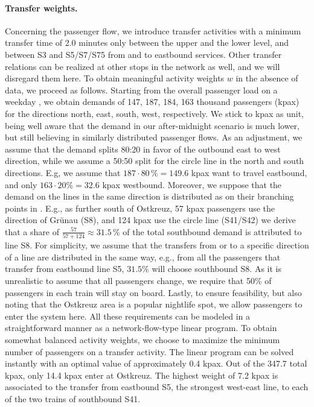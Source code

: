\documentclass[11pt,a4paper]{article}
\theoremstyle{definition}
\theoremstyle{remark}
\begin{document}
\paragraph{Transfer weights.}
Concerning the passenger flow, we introduce transfer activities with a minimum transfer time of 2.0 minutes only between the upper and the lower level, and between S3 and S5/S7/S75 from and to eastbound services. Other transfer relations can be realized at other stops in the network as well, and we will disregard them here. To obtain meaningful activity weights $w$ in the absence of data, we proceed as follows. Starting from the overall passenger load on a weekday \cite{nvp_2019}, we obtain demands of 147, 187, 184, 163 thousand passengers (kpax) for the directions north, east, south, west, respectively.  We stick to kpax as unit, being well aware that the demand in our after-midnight scenario is much lower, but still believing in similarly distributed passenger flows. As an adjustment, we assume that the demand splits 80:20 in favor of the outbound east to west direction, while we assume a 50:50 split for the circle line in the north and south directions. E.g, we assume that $187 \cdot 80\,\% = 149.6$ kpax want to travel eastbound, and only $163 \cdot 20\% = 32.6$ kpax westbound. Moreover, we suppose that the demand on the lines in the same direction is distributed as on their branching points in \cite{nvp_2019}. E.g., as further south of Ostkreuz, 57 kpax passengers use the direction of Grünau (S8), and 124 kpax use the circle line (S41/S42) we derive that a share of $\frac{57}{57+124} \approx 31.5\,\%$ of the total southbound demand is attributed to line S8. For simplicity, we assume that the transfers from or to a specific direction of a line are distributed in the same way, e.g., from all the passengers that transfer from eastbound line S5, $31.5\%$ will choose southbound S8. As it is unrealistic to assume that all passengers change, we require that 50\% of passengers in each train will stay on board. Lastly, to ensure feasibility, but also noting that the Ostkreuz area is a popular nightlife spot, we allow passengers to enter the system here. All these requirements can be modeled in a straightforward manner as a network-flow-type linear program. To obtain somewhat balanced activity weights, we choose to maximize the minimum number of passengers on a transfer activity. The linear program can be solved instantly with an optimal value of approximately 0.4 kpax. Out of the 347.7 total kpax, only 14.4 kpax enter at Ostkreuz. The highest weight of 7.2 kpax is associated to the transfer from eastbound S5, the strongest west-east line, to each of the two trains of southbound S41.
\end{document}
